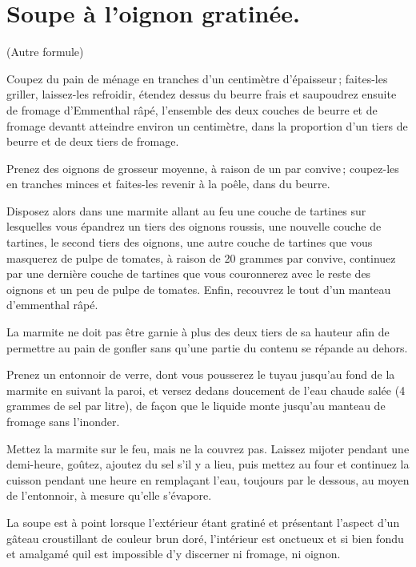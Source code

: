 \section*{\centering Soupe à l'oignon gratinée.}

\medskip

\centering\small\sc(Autre formule)

\bigskip

\justifying
\normalfont
Coupez du pain de ménage en tranches d'un centimètre d'épaisseur ; faites-les
griller, laissez-les refroidir, étendez dessus du beurre frais et saupoudrez
ensuite de fromage d'Emmenthal râpé, l'ensemble des deux couches de beurre et
de fromage devantt atteindre environ un centimètre, dans la proportion d'un
tiers de beurre et de deux tiers de fromage.

Prenez des oignons de grosseur moyenne, à raison de un par convive ; coupez-les
en tranches minces et faites-les revenir à la poêle, dans du beurre.

Disposez alors dans une marmite allant au feu une couche de tartines sur
lesquelles vous épandrez un tiers des oignons roussis, une nouvelle couche de
tartines, le second tiers des oignons, une autre couche de tartines que vous
masquerez de pulpe de tomates, à raison de 20 grammes par convive, continuez
par une dernière couche de tartines que vous couronnerez avec le reste des
oignons et un peu de pulpe de tomates. Enfin, recouvrez le tout d’un manteau
d'emmenthal râpé.

La marmite ne doit pas être garnie à plus des deux tiers de sa hauteur afin de
permettre au pain de gonfler sans qu'une partie du contenu se répande au
dehors.

Prenez un entonnoir de verre, dont vous pousserez le tuyau jusqu'au fond de
la marmite en suivant la paroi, et versez dedans doucement de l'eau chaude salée
(4 grammes de sel par litre), de façon que le liquide monte jusqu'au manteau de
fromage sans l'inonder.

Mettez la marmite sur le feu, mais ne la couvrez pas. Laissez mijoter pendant
une demi-heure, goûtez, ajoutez du sel s'il y a lieu, puis mettez au four et
continuez la cuisson pendant une heure en remplaçant l'eau, toujours par le
dessous, au moyen de l’entonnoir, à mesure qu'elle s'évapore.

La soupe est à point lorsque l'extérieur étant gratiné et présentant l'aspect
d'un gâteau croustillant de couleur brun doré, l'intérieur est onctueux et si
bien fondu et amalgamé quil est impossible d'y discerner ni fromage, ni oignon.

